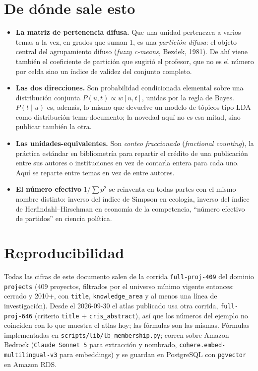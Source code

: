 \documentclass[11pt]{article}
\newcommand{\afinidad}{w}
\begin{document}
\section{De dónde sale esto}
\label{sec:procedencia}

\begin{itemize}
  \item \textbf{La matriz de pertenencia difusa.} Que una unidad pertenezca
    a varios temas a la vez, en grados que suman 1, es una \emph{partición
    difusa}: el objeto central del agrupamiento difuso (\emph{fuzzy
    c-means}, Bezdek, 1981). De ahí viene también el coeficiente de
    partición que sugirió el profesor, que no es el número por celda sino
    un índice de validez del conjunto completo.
  \item \textbf{Las dos direcciones.} Son probabilidad condicionada
    elemental sobre una distribución conjunta $P(u,t) \propto \afinidad[u,t]$,
    unidas por la regla de Bayes. $P(t\mid u)$ es, además, lo mismo que
    devuelve un modelo de tópicos tipo LDA como distribución
    tema-documento; la novedad aquí no es esa mitad, sino publicar también
    la otra.
  \item \textbf{Las unidades-equivalentes.} Son \emph{conteo fraccionado}
    (\emph{fractional counting}), la práctica estándar en bibliometría para
    repartir el crédito de una publicación entre sus autores o
    instituciones en vez de contarla entera para cada uno. Aquí se reparte
    entre temas en vez de entre autores.
  \item \textbf{El número efectivo} $1/\sum p^2$ se reinventa en todas
    partes con el mismo nombre distinto: inverso del índice de Simpson en
    ecología, inverso del índice de Herfindahl--Hirschman en economía de la
    competencia, ``número efectivo de partidos'' en ciencia política.
\end{itemize}

\section{Reproducibilidad}

Todas las cifras de este documento salen de la corrida \texttt{full-proj-409}
del dominio \texttt{projects} (409 proyectos, filtrados por el universo mínimo
vigente entonces: cerrado y 2010+, con \texttt{title}, \texttt{knowledge\_area}
y al menos una línea de investigación). Desde el 2026-09-30 el atlas publicado
usa otra corrida, \texttt{full-proj-646} (criterio \texttt{title} +
\texttt{cris\_abstract}), así que los números del ejemplo no coinciden con lo
que muestra el atlas hoy; las fórmulas son las mismas. Fórmulas implementadas
en \texttt{scripts/lib/lb\_membership.py}; corren sobre Amazon Bedrock
(\texttt{Claude Sonnet 5} para extracción y nombrado,
\texttt{cohere.embed-multilingual-v3} para embeddings) y se guardan en
PostgreSQL con \texttt{pgvector} en Amazon RDS.
\end{document}
